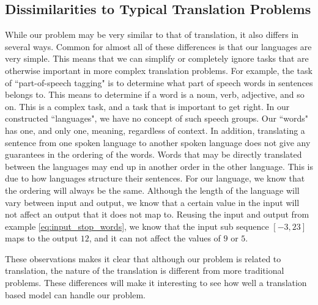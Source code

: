 \subsection{Dissimilarities to Typical Translation Problems}
While our problem may be very similar to that of translation, it also differs in several ways. Common for almost all of these differences is that our languages are very simple. This means that we can simplify or completely ignore tasks that are otherwise important in more complex translation problems. For example, the task of ``part-of-speech tagging" is to determine what part of speech words in sentences belongs to. This means to determine if a word is a noun, verb, adjective, and so on. This is a complex task, and a task that is important to get right. In our constructed ``languages", we have no concept of such speech groups. Our ``words" has one, and only one, meaning, regardless of context. In addition, translating a sentence from one spoken language to another spoken language does not give any guarantees in the ordering of the words. Words that may be directly translated between the languages may end up in another order in the other language. This is due to how languages structure their sentences. For our language, we know that the ordering will always be the same. Although the length of the language will vary between input and output, we know that a certain value in the input will not affect an output that it does not map to. Reusing the input and output from example \ref{eq:input_stop_words}, we know that the input sub sequence \([-3, 23]\) maps to the output \(12\), and it can not affect the values of \(9\) or \(5\).

These observations makes it clear that although our problem is related to translation, the nature of the translation is different from more traditional problems. These differences will make it interesting to see how well a translation based model can handle our problem.